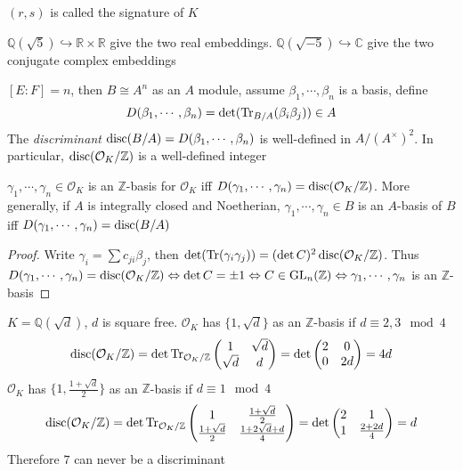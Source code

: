 \documentclass[main]{subfiles}
\begin{document}
\begin{note}
$(r,s)$ is called the signature of $K$
\end{note}

\begin{example}
$\mathbb Q(\sqrt 5)\hookrightarrow\mathbb R\times\mathbb R$ give the two real embeddings. $\mathbb Q(\sqrt{-5})\hookrightarrow\mathbb C$ give the two conjugate complex embeddings
\end{example}

\begin{definition}
$[E:F]=n$, then $B\cong A^n$ as an $A$ module, assume $\beta_1,\cdots,\beta_n$ is a basis, define
\[D(\beta_1,\cdots,\beta_n)=\det(\operatorname{Tr}_{B/A}(\beta_i\beta_j))\in A\]
The \textit{discriminant} $\operatorname{disc}(B/A)=D(\beta_1,\cdots,\beta_n)$ is well-defined in $A/(A^\times)^2$. In particular, $\operatorname{disc}(\mathcal O_K/\mathbb Z)$ is a well-defined integer
\end{definition}

\begin{lemma}
$\gamma_1,\cdots,\gamma_n\in\mathcal O_K$ is an $\mathbb Z$-basis for $\mathcal O_K$ iff $D(\gamma_1,\cdots,\gamma_n)=\operatorname{disc}(\mathcal O_K/\mathbb Z)$. More generally, if $A$ is integrally closed and Noetherian, $\gamma_1,\cdots,\gamma_n\in B$ is an $A$-basis of $B$ iff $D(\gamma_1,\cdots,\gamma_n)=\operatorname{disc}(B/A)$
\end{lemma}

\begin{proof}
Write $\gamma_i=\sum c_{ji}\beta_j$, then $\det(\operatorname{Tr}(\gamma_i\gamma_j))=(\det C)^2\operatorname{disc}(\mathcal O_K/\mathbb Z)$. Thus $D(\gamma_1,\cdots,\gamma_n)=\operatorname{disc}(\mathcal O_K/\mathbb Z)\Leftrightarrow \det C=\pm1\Leftrightarrow C\in\operatorname{GL}_n(\mathbb Z)\Leftrightarrow\gamma_1,\cdots,\gamma_n$ is an $\mathbb Z$-basis
\end{proof}

\begin{example}
$K=\mathbb Q(\sqrt d)$, $d$ is square free. $\mathcal O_K$ has $\{1,\sqrt d\}$ as an $\mathbb Z$-basis if $d\equiv2,3\mod4$
\[\operatorname{disc}(\mathcal O_K/\mathbb Z)=\det\operatorname{Tr}_{\mathcal O_K/\mathbb Z}\begin{pmatrix}
1&\sqrt d \\
\sqrt d&d
\end{pmatrix}=\det\begin{pmatrix}
2&0 \\
0&2d
\end{pmatrix}=4d\]
$\mathcal O_K$ has $\{1,\frac{1+\sqrt{d}}{2}\}$ as an $\mathbb Z$-basis if $d\equiv1\mod4$
\[\operatorname{disc}(\mathcal O_K/\mathbb Z)=\det\operatorname{Tr}_{\mathcal O_K/\mathbb Z}\begin{pmatrix}
1&\frac{1+\sqrt d}{2} \\
\frac{1+\sqrt d}{2}&\frac{1+2\sqrt d+d}{4}
\end{pmatrix}=\det\begin{pmatrix}
2&1 \\
1&\frac{2+2d}{4}
\end{pmatrix}=d\]
Therefore $7$ can never be a discriminant
\end{example}
\end{document}
